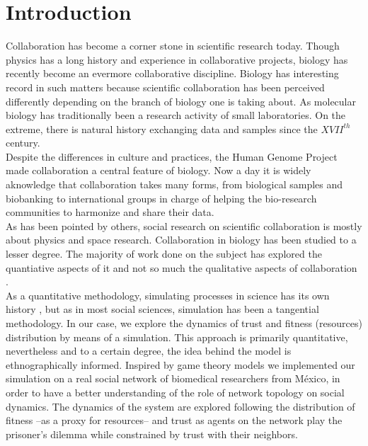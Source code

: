 \section{Introduction}
\label{intro}

Collaboration has become a corner stone in scientific research today.
Though physics has a long history and experience in collaborative
projects, biology has recently become an evermore collaborative
discipline\cite{Vermeulen2013}. Biology has interesting record in such
matters because scientific collaboration has been perceived
differently depending on the branch of biology one is taking about. As
molecular biology has traditionally been a research activity of small
laboratories\cite{KnorrCetina1999,Strasser2006}. On the extreme, there
is natural history exchanging data and samples since the $XVII^{th}$
century\cite{Muller2012,Strasser2012}.\\ 

Despite the differences in culture and practices, the Human Genome
Project made collaboration a central feature of biology. Now a day it
is widely aknowledge that collaboration takes many forms, from
biological samples and biobanking to international groups in charge of
helping the bio-research communities to harmonize and share their
data.\\ 

As has been pointed by others, social research on scientific
collaboration is mostly about physics and space research\cite{Vermeulen2013}.
Collaboration in biology has been studied to a lesser degree. The
majority of work done on the subject has explored the quantiative
aspects of it\cite{Newman2001,Newman2004,Elango2012,HernandezLemus2013} and not so much the
qualitative aspects of collaboration \cite{Strasser2006,Strasser2012}.\\


As a quantitative methodology, simulating processes in science has its own history
\cite{Gilbert1997,Edmonds2011}, but as in most social sciences, simulation has 
been a tangential methodology. In our case, we explore the dynamics of
trust and fitness (resources) distribution by means of a simulation.
This approach is primarily quantitative, nevertheless and to a certain
degree, the idea behind the model is ethnographically informed.
Inspired by game theory models we implemented our simulation on a 
real social network of biomedical researchers from M\'exico, in order
to have a better understanding of the role of network topology on
social dynamics. The dynamics of the system are explored following the
distribution of fitness --as a proxy for resources-- and trust as
agents on the network play the prisoner's dilemma while constrained by
trust with their neighbors.\\ 


